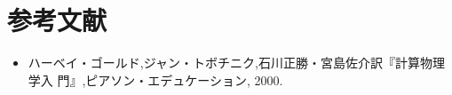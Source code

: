 \documentclass{jsarticle}
\begin{document}
    \section{参考文献}
        \begin{itemize}
            \item ハーベイ・ゴールド,ジャン・トボチニク,石川正勝・宮島佐介訳『計算物理学入
            門』,ピアソン・エデュケーション, 2000.
        \end{itemize}
\end{document}
